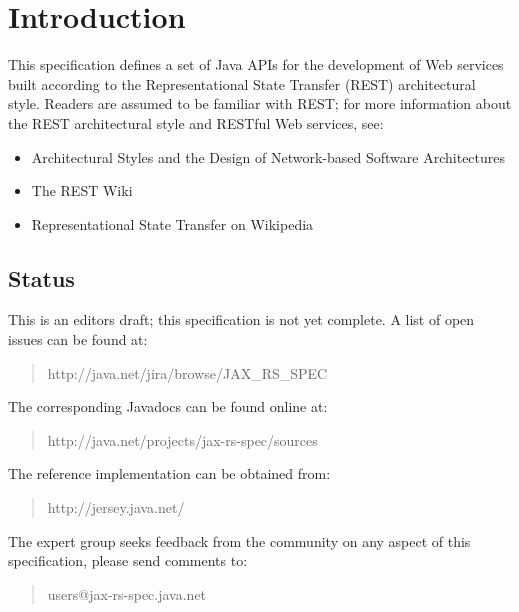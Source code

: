 \chapter{Introduction}

This specification defines a set of Java APIs for the development of Web services built according to the Representational State Transfer\cite{rest} (REST) architectural style. Readers are assumed to be familiar with 
REST; for more information about the REST architectural style and RESTful Web services, see:

\begin{itemize}
\item Architectural Styles and the Design of Network-based Software Architectures\cite{rest}
\item The REST Wiki\cite{restwiki}
\item Representational State Transfer on Wikipedia\cite{restwikipedia}
\end{itemize}

\section{Status}

This is an editors draft; this specification is not yet complete. A list of open issues can be found at:

\begin{quote}
http://java.net/jira/browse/JAX\_RS\_SPEC
\end{quote}

The corresponding Javadocs can be found online at:

\begin{quote}
http://java.net/projects/jax-rs-spec/sources
\end{quote}

The reference implementation can be obtained from:

\begin{quote}
http://jersey.java.net/
\end{quote}

The expert group seeks feedback from the community on any aspect of this specification, please send comments to:

\begin{quote}
users@jax-rs-spec.java.net
\end{quote}

